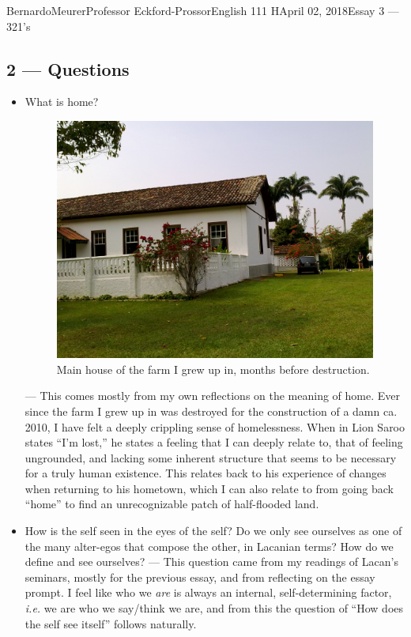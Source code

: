\documentclass[12pt,letterpaper]{article}
\begin{document}
\begin{mla}{Bernardo}{Meurer}{Professor Eckford-Prossor}{English 111 H}{April 02, 2018}{Essay 3 --- 321's}
    \subsection*{2 --- Questions}
    \begin{itemize}
        \item What is home?
            \begin{figure}[H]
            \includegraphics{./farm.jpg}
            \caption{Main house of the farm I grew up in, months before destruction.}
        \end{figure}
            --- This comes mostly from my own reflections on the meaning of home. Ever since the farm I grew up in was destroyed for the construction of a damn ca. 2010, I have felt a deeply crippling sense of homelessness.
            When in Lion Saroo states ``I'm lost,'' he states a feeling that I can deeply relate to, that of feeling ungrounded, and lacking some inherent structure that seems to be necessary for a truly human existence. This relates back to his experience of changes when returning to his hometown, which I can also relate to from going back ``home'' to find an unrecognizable patch of half-flooded land.

        \item How is the self seen in the eyes of the self? Do we only see ourselves as one of the many alter-egos that compose the other, in Lacanian terms? How do we define and see ourselves? --- This question came from my readings of Lacan's seminars, mostly for the previous essay, and from reflecting on the essay prompt.
            I feel like who we \emph{are} is always an internal, self-determining factor, \emph{i.e.} we are who we say/think we are, and from this the question of ``How does the self see itself'' follows naturally.
    \end{itemize}

\end{mla}
\end{document}
